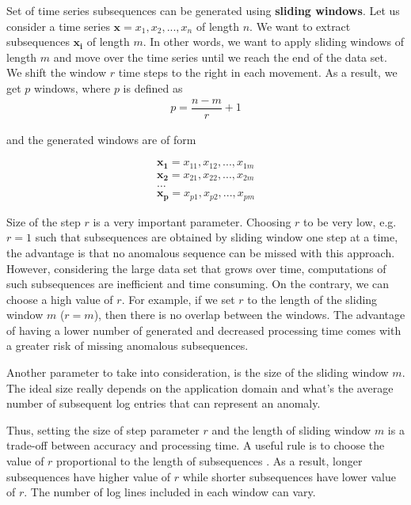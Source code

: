 Set of time series subsequences can be generated using \textbf{sliding windows}. Let us consider a time series $\mathbf{x} = x_1, x_2, ..., x_n$ of length $n$. We want to extract subsequences $\mathbf{x_i}$ of length $m$. In other words, we want to apply sliding windows of length $m$ and move over the time series until we reach the end of the data set. We shift the window $r$ time steps to the right in each movement. As a result, we get $p$ windows, where $p$ is defined as 
    \begin{gather*}
        p = \dfrac{n - m}{r} + 1
    \end{gather*}

and the generated windows are of form 

\begin{gather*}
    \mathbf{x_1} = x_{11}, x_{12},..., x_{1m} \\
    \mathbf{x_2} = x_{21}, x_{22},..., x_{2m} \\
    \ldots\\
    \mathbf{x_p} = x_{p1}, x_{p2},..., x_{pm} 
\end{gather*}

Size of the step $r$ is a very important parameter. Choosing $r$ to be very low, e.g. $r = 1$ such that subsequences are obtained by sliding window one step at a time, the advantage is that no anomalous sequence can be missed with this approach. However, considering the large data set that grows over time, computations of such subsequences are inefficient and time consuming. On the contrary, we can choose a high value of $r$. For example, if we set $r$ to the length of the sliding window $m$ ($r = m$), then there is no overlap between the windows. The advantage of having a lower number of generated and decreased processing time comes with a greater risk of missing anomalous subsequences. 

Another parameter to take into consideration, is the size of the sliding window $m$. The ideal size really depends on the application domain and what's the average number of subsequent log entries that can represent an anomaly. 

Thus, setting the size of step parameter $r$ and the length of sliding window $m$ is a trade-off between accuracy and processing time. A useful rule is to choose the value of $r$ proportional to the length of subsequences \cite{izakian2013}. As a result, longer subsequences have higher value of $r$ while shorter subsequences have lower value of $r$. The number of log lines included in each window can vary. 

